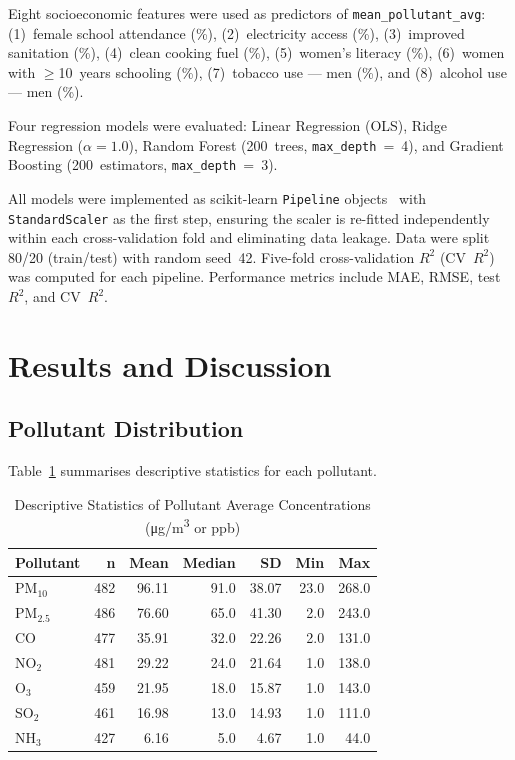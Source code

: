 \documentclass[10pt, conference]{IEEEtran}
\begin{document}
Eight socioeconomic features were used as predictors of
\texttt{mean\_pollutant\_avg}:
(1)~female school attendance (\%),
(2)~electricity access (\%),
(3)~improved sanitation (\%),
(4)~clean cooking fuel (\%),
(5)~women's literacy (\%),
(6)~women with $\geq$10~years schooling (\%),
(7)~tobacco use --- men (\%), and
(8)~alcohol use --- men (\%).

Four regression models were evaluated: Linear Regression
(OLS), Ridge Regression ($\alpha = 1.0$), Random Forest
(200~trees, \texttt{max\_depth}~=~4), and Gradient Boosting
(200~estimators, \texttt{max\_depth}~=~3).

All models were implemented as scikit-learn \texttt{Pipeline}
objects~\cite{pedregosa2011} with \texttt{StandardScaler} as
the first step, ensuring the scaler is re-fitted independently
within each cross-validation fold and eliminating data
leakage.
Data were split 80/20 (train/test) with random seed~42.
Five-fold cross-validation $R^2$ (CV~$R^2$) was computed for
each pipeline.
Performance metrics include MAE, RMSE, test~$R^2$, and
CV~$R^2$.

\section{Results and Discussion}
\label{sec:results}

\subsection{Pollutant Distribution}

Table~\ref{tab:pollutant_stats} summarises descriptive
statistics for each pollutant.

\begin{table}[htbp]
  \centering
  \caption{Descriptive Statistics of Pollutant Average
           Concentrations (\si{\micro g/m^3} or ppb)}
  \label{tab:pollutant_stats}
  \renewcommand{\arraystretch}{1.1}
  \begin{tabular}{@{}lrrrrrr@{}}
    \toprule
    \textbf{Pollutant} & \textbf{n} & \textbf{Mean} & \textbf{Median}
      & \textbf{SD} & \textbf{Min} & \textbf{Max} \\
    \midrule
    PM$_{10}$  & 482 & 96.11 & 91.0 & 38.07 & 23.0 & 268.0 \\
    PM$_{2.5}$ & 486 & 76.60 & 65.0 & 41.30 &  2.0 & 243.0 \\
    CO         & 477 & 35.91 & 32.0 & 22.26 &  2.0 & 131.0 \\
    NO$_2$     & 481 & 29.22 & 24.0 & 21.64 &  1.0 & 138.0 \\
    O$_3$      & 459 & 21.95 & 18.0 & 15.87 &  1.0 & 143.0 \\
    SO$_2$     & 461 & 16.98 & 13.0 & 14.93 &  1.0 & 111.0 \\
    NH$_3$     & 427 &  6.16 &  5.0 &  4.67 &  1.0 &  44.0 \\
    \bottomrule
  \end{tabular}
\end{table}
\end{document}
